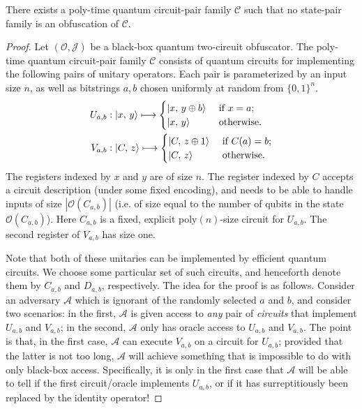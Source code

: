 \documentclass[envcountsame]{llncs}
\numberwithin{equation}{section}
\newcommand{\algo}{\mathcal}
\begin{document}
\begin{theorem}\label{thm:pair-impossibility}
There exists a poly-time quantum circuit-pair family $\mathcal C$ such that no state-pair family is an obfuscation of $\mathcal C$.
\end{theorem}
\begin{proof}
Let $(\mathcal O, \mathcal J)$ be a black-box quantum two-circuit obfuscator. 
The poly-time quantum circuit-pair family $\mathcal C$ consists of quantum circuits for implementing the following pairs of unitary operators. Each pair is parameterized by an input size $n$, as well as bitstrings $a, b$ chosen uniformly at random from $\{0, 1\}^n$.
\begin{align}\label{eq:pair-impossible}
U_{a, b} &: {\left\vert{x,\, y}\right\rangle} \longmapsto
\begin{cases}
{\left\vert{x,\, y \oplus b}\right\rangle} &\text{ if } x = a;\\
{\left\vert{x,\, y}\right\rangle} &\text{ otherwise}.
\end{cases}\\
V_{a, b} &: {\left\vert{C,\, z}\right\rangle} \longmapsto
\begin{cases}
{\left\vert{C,\, z \oplus 1}\right\rangle} &\text{ if } C(a) = b;\\
{\left\vert{C,\, z}\right\rangle} &\text{ otherwise}.
\end{cases}
\end{align}
The registers indexed by $x$ and $y$ are of size $n$. The register indexed by $C$ accepts a circuit description (under some fixed encoding), and needs to be able to handle inputs of size $|\algo O(C_{a, b})|$ (i.e. of size equal to the number of qubits in the state $\algo O(C_{a, b})$). Here $C_{a, b}$ is a fixed, explicit poly$(n)$-size circuit for $U_{a, b}$. The second register of $V_{a, b}$ has size one. 

Note that both of these unitaries can be implemented by efficient quantum circuits. We choose some particular set of such circuits, and henceforth denote them by $C_{a,b}$ and $D_{a,b}$, respectively. The idea for the proof is as follows. Consider an adversary $\algo A$ which is ignorant of the randomly selected $a$ and $b$, and consider two scenarios: in the first, $\algo A$ is given access to \emph{any} pair of \emph{circuits} that implement $U_{a, b}$ and $V_{a, b}$; in the second, $\algo A$ only has oracle access to $U_{a, b}$ and $V_{a, b}$. The point is that, in the first case, $\algo A$ can execute $V_{a, b}$ on a circuit for $U_{a, b}$; provided that the latter is not too long, $\algo A$ will achieve something that is impossible to do with only black-box access. Specifically, it is only in the first case that $\algo A$ will be able to tell if the first circuit/oracle implements $U_{a, b}$, or if it has surreptitiously been replaced by the identity operator!


\end{proof}
\end{document}
